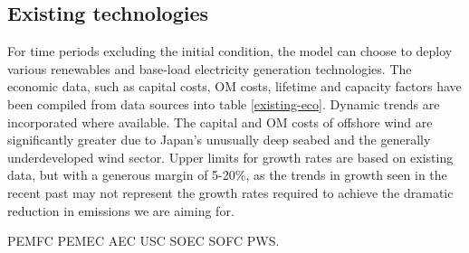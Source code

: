 \subsection{Existing technologies}

For time periods excluding the initial condition, the model can choose to deploy various renewables and base-load electricity generation technologies. The economic data, such as capital costs, \gls{OM} costs, lifetime and capacity factors have been compiled from data sources into table \ref{existing-eco}. Dynamic trends are incorporated where available. The capital and \gls{OM} costs of offshore wind are significantly greater due to Japan's unusually deep seabed and the generally underdeveloped wind sector. Upper limits for growth rates are based on existing data, but with a generous margin of 5-20\%, as the trends in growth seen in the recent past may not represent the growth rates required to achieve the dramatic reduction in emissions we are aiming for.

\gls{PEMFC} \gls{PEMEC} \gls{AEC} \gls{USC} \gls{SOEC} \gls{SOFC} \gls{PWS}.


